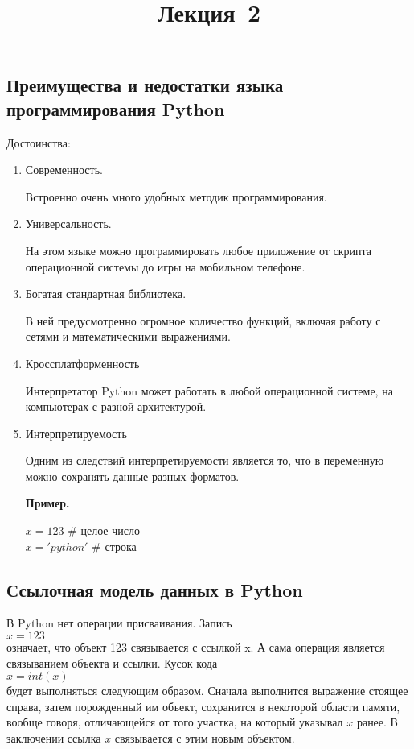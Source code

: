 \documentclass[a4paper, fleqn]{article}
\title{Лекция \textnumero\,2}
\author{}
\date{}
\newenvironment{example}[1][]{\medskip \noindent \textbf{Пример. #1}\par \nopagebreak}{\medskip \par} %
\begin{document}
	\maketitle
	\subsection*{Преимущества и недостатки языка программирования Python}
		Достоинства:
		\begin{enumerate}
			\item Современность.
			
			Встроенно очень много удобных методик программирования.
			
			\item Универсальность.
			
			На этом языке можно программировать любое приложение от скрипта операционной системы до игры на мобильном телефоне.
			
			\item Богатая стандартная библиотека.
			
			В ней предусмотренно огромное количество функций, включая работу с сетями и математическими выражениями.
			
			\item Кроссплатформенность
			
			Интерпретатор Python может работать в любой операционной системе, на компьютерах с разной архитектурой.
			
			\item Интерпретируемость
			
			Одним из следствий интерпретируемости является то, что в переменную можно сохранять данные разных форматов. 
			
			\begin{example}
				$x = 123$  \# целое число \\
				$x = 'python'$  \# строка	
			\end{example}
		\end{enumerate}
		
	\subsection* {Ссылочная модель данных в Python}
	
		В Python нет операции присваивания. Запись\\
		$x = 123$ \\
		означает, что объект 123 связывается с ссылкой x. А сама операция является связыванием объекта и ссылки.
		Кусок кода \\
		$x = int(x)$ \\
		будет выполняться следующим образом. Сначала выполнится выражение стоящее справа, затем порожденный им объект, сохранится в некоторой области памяти, вообще говоря, отличающейся от того участка, на который указывал $x$ ранее. В заключении ссылка $x$ связывается с этим новым объектом.
		
\end{document}
